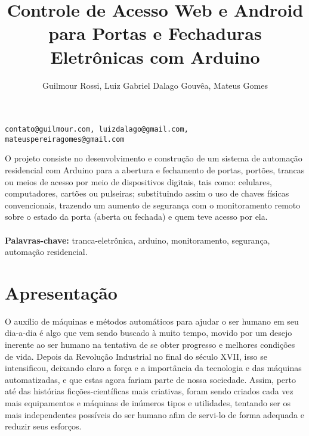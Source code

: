 \documentclass[12pt]{article}
\title{Controle de Acesso Web e Android para Portas e Fechaduras Eletrônicas com Arduino}
\author{Guilmour Rossi, Luiz Gabriel Dalago Gouvêa, Mateus Gomes}
\begin{document}
 


\maketitle
\begin{center}
\texttt{contato@guilmour.com, luizdalago@gmail.com, mateuspereiragomes@gmail.com}
\end{center}

%
     
\begin{resumo} 
  O projeto consiste no desenvolvimento e construção de um sistema de automação residencial com Arduino para a abertura e fechamento de portas, portões, trancas ou meios de acesso por meio de dispositivos digitais, tais como: celulares, computadores, cartões ou pulseiras; substituindo assim o uso de chaves físicas convencionais, trazendo um aumento de segurança com o monitoramento remoto sobre o estado da porta (aberta ou fechada) e quem teve acesso por ela.
  \textbf{\\\\Palavras-chave:} tranca-eletrônica, arduino, monitoramento, segurança, automação residencial.
\end{resumo}




\section{Apresentação}



O auxílio de máquinas e métodos automáticos para ajudar o ser humano em seu dia-a-dia é algo que vem sendo buscado à muito tempo, movido por um desejo inerente ao ser humano na tentativa de se obter progresso e melhores condições de vida. Depois da Revolução Industrial no final do século XVII, isso se intensificou, deixando claro a força e a importância da tecnologia e das máquinas automatizadas, e que estas agora fariam parte de nossa sociedade. Assim, perto até das histórias ficções-científicas mais criativas, foram sendo criados cada vez mais equipamentos e máquinas de inúmeros tipos e utilidades, tentando ser os mais independentes possíveis do ser humano afim de servi-lo de forma adequada e reduzir seus esforços. 
\end{document}
